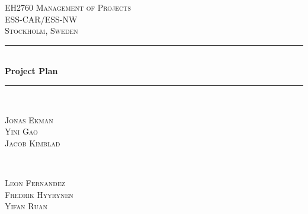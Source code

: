 \documentclass[11pt, titlepage]{article} %
\begin{document}
{} %



\begin{titlepage} %
	\newcommand{\HRule}{\rule{\linewidth}{0.5mm}} %
	
	\center %
	
	
	\textsc{\LARGE EH2760 Management of Projects}\\[1.5cm] %
	
	\textsc{\Large ESS-CAR/ESS-NW}\\[0.5cm] %
	
	\textsc{\large Stockholm, Sweden}\\[0.5cm] %
	
	
	\HRule\\[0.4cm]
	
	{\huge\bfseries Project Plan}\\[0.4cm] %
	
	\HRule\\[1.5cm]
	
	
	\begin{minipage}{0.4\textwidth}
		\begin{flushleft}
			\large
                        \textsc{Jonas Ekman}
			\\
			\textsc{Yini Gao}
                        \\
                        \textsc{Jacob Kimblad}
		\end{flushleft}
	\end{minipage}
	~
	\begin{minipage}{0.4\textwidth}
		\begin{flushright}
			\large
                        \textsc{Leon Fernandez}
			\\
			\textsc{Fredrik Hyyrynen}
                        \\
                        \textsc{Yifan Ruan}
		\end{flushright}
	\end{minipage}
	

\end{titlepage}
\end{document}
